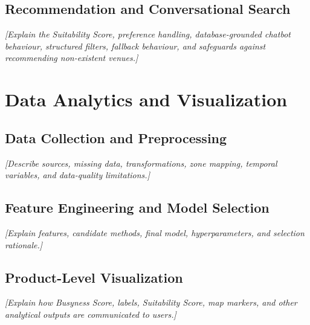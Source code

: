 ﻿\documentclass[conference,a4paper]{IEEEtran}
\newif\ifshowguidance
\newcommand{\guidance}[1]{%
  \ifshowguidance
    \par\smallskip
    \noindent\fcolorbox{gray}{gray!8}{%
      \parbox{\dimexpr\columnwidth-2\fboxsep-2\fboxrule\relax}{%
        \footnotesize\color{gray!75!black}\textbf{Draft guidance:} #1}}
    \par\smallskip
  \fi
}
\begin{document}
\subsection{Recommendation and Conversational Search}
\textit{[Explain the Suitability Score, preference handling, database-grounded
chatbot behaviour, structured filters, fallback behaviour, and safeguards
against recommending non-existent venues.]}

\section{Data Analytics and Visualization}
\label{sec:data-analytics}
\guidance{Target: 1.00--1.10 pages. Report the source and properties of the
data, cleaning and preprocessing, feature engineering, train/test strategy,
model selection and rationale, and how outputs are visualised in the
product. Include concise, interpretable quantitative graphics rather than
decorative screenshots.}

\subsection{Data Collection and Preprocessing}
\textit{[Describe sources, missing data, transformations, zone mapping,
temporal variables, and data-quality limitations.]}

\subsection{Feature Engineering and Model Selection}
\textit{[Explain features, candidate methods, final model, hyperparameters,
and selection rationale.]}

\subsection{Product-Level Visualization}
\textit{[Explain how Busyness Score, labels, Suitability Score, map markers,
and other analytical outputs are communicated to users.]}

\end{document}
